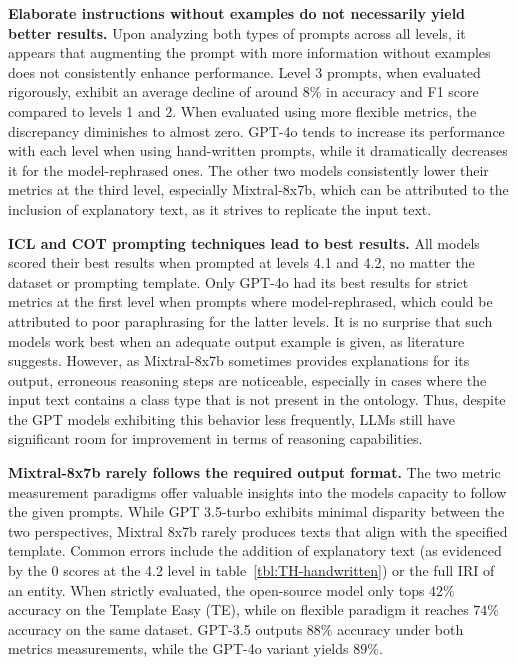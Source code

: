 \documentclass[runningheads]{llncs}
\begin{document}
\textbf{Elaborate instructions without examples do not necessarily yield better results.} 
Upon analyzing both types of prompts across all levels, it appears that augmenting the prompt with more information without examples does not consistently enhance performance. Level 3 prompts, when evaluated rigorously, exhibit an average decline of around $8\%$ in accuracy and F1 score compared to levels 1 and 2. When evaluated using more flexible metrics, the discrepancy diminishes to almost zero. GPT-4o tends to increase its performance with each level when using hand-written prompts, while it dramatically decreases it for the model-rephrased ones. The other two models consistently lower their metrics at the third level, especially Mixtral-8x7b, which can be attributed to the inclusion of explanatory text, as it strives to replicate the input text.



\textbf{ICL and COT prompting techniques lead to best results.} All models scored their best results when prompted at levels 4.1 and 4.2, no matter the dataset or prompting template. 
Only GPT-4o had its best results for strict metrics at the first level when prompts where model-rephrased, which could be attributed to poor paraphrasing for the latter levels.
It is no surprise that such models work best when an adequate output example is given, as literature~\cite{teler2023} suggests. However, as Mixtral-8x7b sometimes provides explanations for its output, erroneous reasoning steps are noticeable, especially in cases where the input text contains a class type that is not present in the ontology. Thus, despite the GPT models exhibiting this behavior less frequently, LLMs still have significant room for improvement in terms of reasoning capabilities.

\textbf{Mixtral-8x7b rarely follows the required output format.}  The two metric measurement paradigms offer valuable insights into the models capacity to follow the given prompts. While GPT 3.5-turbo exhibits minimal disparity between the two perspectives, Mixtral 8x7b rarely produces texts that align with the specified template. Common errors include the addition of explanatory text (as evidenced by the 0 scores at the 4.2 level in table~\ref{tbl:TH-handwritten}) or the full IRI of an entity. When strictly evaluated, the open-source model only tops $42\%$ accuracy on the Template Easy (TE), while on flexible paradigm it reaches $74\%$ accuracy on the same dataset. GPT-3.5 outputs $88\%$ accuracy under both metrics measurements, while the GPT-4o variant yields $89\%$.
\end{document}
